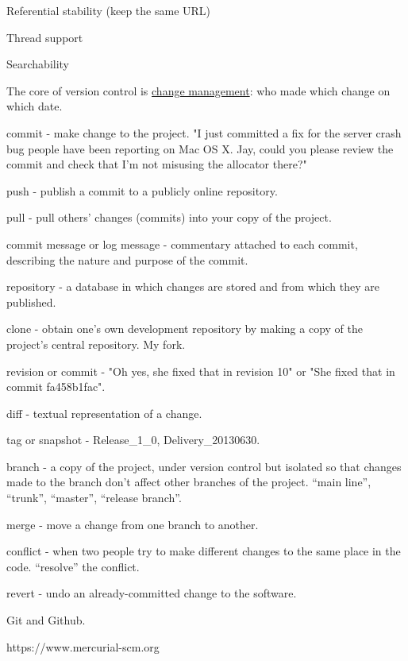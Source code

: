 \documentclass[landscape,30pt]{foils}
\begin{document}
Referential stability (keep the same URL)

Thread support

Searchability


The core of version control is \underline{change management}: who made which change on which date.

commit - make change to the project.  "I just committed a fix for the server crash bug people have been reporting on Mac OS X. Jay, could you please review the commit and check that I'm not misusing the allocator there?"

push - publish a commit to a publicly online repository.

pull - pull others' changes (commits) into your copy of the project.

commit message or log message -  commentary attached to each commit, describing the nature and purpose of the commit.

repository -  a database in which changes are stored and from which they are published.

clone - obtain one's own development repository by making a copy of the project's central repository.  My fork.

revision or  commit - "Oh yes, she fixed that in revision 10" or "She fixed that in commit fa458b1fac".

diff - textual representation of a change.

tag or snapshot - Release\_1\_0, Delivery\_20130630.

branch - a copy of the project, under version control but isolated so that changes made to the branch don't affect other branches of the project. ``main line'', ``trunk'', ``master'', ``release branch''.

merge - move a change from one branch to another.

conflict - when two people try to make different changes to the same place in the code.  ``resolve'' the conflict.

revert - undo an already-committed change to the software.



Git and Github.

https://www.mercurial-scm.org
\end{document}
